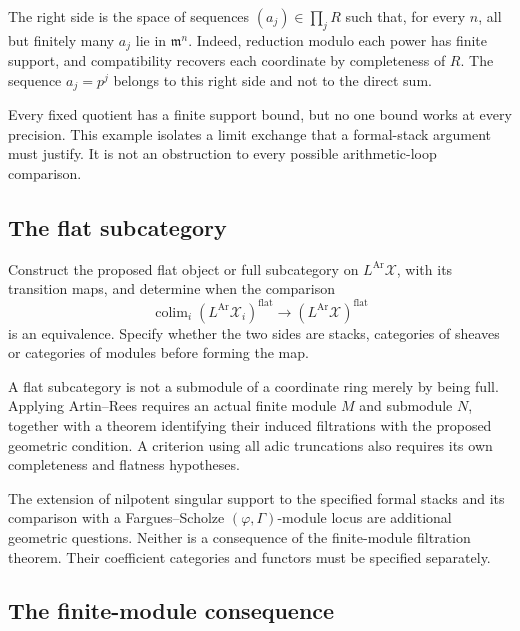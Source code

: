 The right side is the space of sequences \((a_j)\in\prod_jR\) such
that, for every \(n\), all but finitely many \(a_j\) lie in
\(\mathfrak m^n\). Indeed, reduction modulo each power has finite
support, and compatibility recovers each coordinate by completeness
of \(R\). The sequence \(a_j=p^j\) belongs to this right side and
not to the direct sum.

Every fixed quotient has a finite support bound,
but no one bound works at every precision. This example isolates a
limit exchange that a formal-stack argument must justify. It is not
an obstruction to every possible arithmetic-loop comparison.

\subsection{The flat subcategory}
\label{v4-arith:w5-i:R1-formal-c-closure}

\begin{question}
\label{v4-arith:w5-i:prop:c2-closure}
Construct the proposed flat object or full subcategory on
\(L^{\mathrm{Ar}}\mathcal X\), with its transition maps, and determine
when the comparison
\[
 \operatorname{colim}_i(L^{\mathrm{Ar}}\mathcal X_i)^{\mathrm{flat}}
       \longrightarrow(L^{\mathrm{Ar}}\mathcal X)^{\mathrm{flat}}
\]
is an equivalence. Specify whether the two sides are stacks,
categories of sheaves or categories of modules before forming the map.
\end{question}

A flat subcategory is not a submodule of a coordinate ring merely by
being full. Applying Artin--Rees requires an actual finite module
\(M\) and submodule \(N\), together with a theorem identifying their
induced filtrations with the proposed geometric condition.
A criterion using all adic truncations also requires its own
completeness and flatness hypotheses.

\begin{remark}
\label{v4-arith:w5-i:rem:c1-c3-open}
The extension of nilpotent singular support to the specified formal
stacks and its comparison with a Fargues--Scholze
\((\varphi,\Gamma)\)-module locus are additional geometric questions.
Neither is a consequence of the finite-module filtration theorem.
Their coefficient categories and functors must be specified separately.
\end{remark}

\subsection{The finite-module consequence}
\label{v4-arith:w5-i:formal-conclusion}


